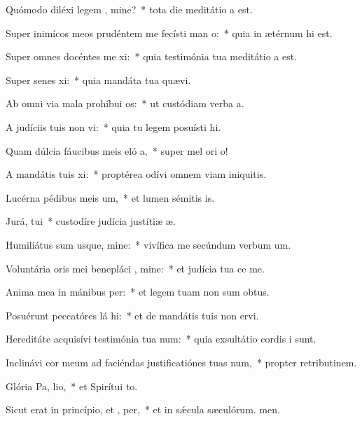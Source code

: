 \item Quómodo diléxi legem , mine?~* tota die meditátio a est.
\item Super inimícos meos prudéntem me fecísti man o:~* quia in ætérnum hi est.
\item Super omnes docéntes me xi:~* quia testimónia tua meditátio a est.
\item Super senes xi:~* quia mandáta tua quævi.
\item Ab omni via mala prohíbui  os:~* ut custódiam verba a.
\item A judíciis tuis non vi:~* quia tu legem posuísti hi.
\item Quam dúlcia fáucibus meis eló a,~* super mel ori o!
\item A mandátis tuis xi:~* proptérea odívi omnem viam iniquitis.
\item Lucérna pédibus meis  um,~* et lumen sémitis is.
\item Jurá,  tui~* custodíre judícia justítiæ æ.
\item Humiliátus sum usque, mine:~* vivífica me secúndum verbum um.
\item Voluntária oris mei benepláci , mine:~* et judícia tua ce me.
\item Anima mea in mánibus  per:~* et legem tuam non sum obtus.
\item Posuérunt peccatóres lá hi:~* et de mandátis tuis non ervi.
\item Hereditáte acquisívi testimónia tua  num:~* quia exsultátio cordis i sunt.
\item Inclinávi cor meum ad faciéndas justificatiónes tuas  num,~* propter retributinem.
\item Glória Pa,  lio,~* et Spirítui to.
\item Sicut erat in princípio, et ,  per,~* et in sǽcula sæculórum. men.
